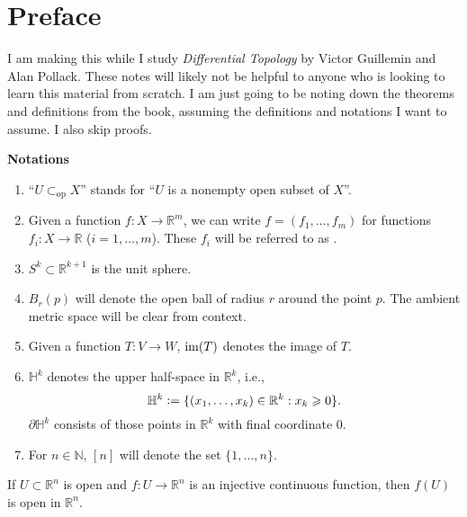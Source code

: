 \documentclass[12pt]{article}
\newcommand{\opsub}{\subset_{\operatorname{op}}}
\begin{document}
\coverpage
\thispagestyle{empty}
\updated{\today}
\thispagestyle{empty}
\tableofcontents
\pagestyle{fancy}
\setcounter{section}{-1}

\section{Preface}

I am making this while I study \emph{Differential Topology} by Victor Guillemin and Alan Pollack. These notes will likely not be helpful to anyone who is looking to learn this material from scratch. I am just going to be noting down the theorems and definitions from the book, assuming the definitions and notations I want to assume. I also skip proofs.

\textbf{Notations}
\begin{enumerate}
	\item ``$U \opsub X$'' stands for ``$U$ is a nonempty open subset of $X$''.
	\item Given a function $f : X \to \mathbb{R}^{m}$, we can write $f = (f_{1}, \ldots, f_{m})$ for functions $f_{i} : X \to \mathbb{R}$ ($i = 1, \ldots, m$). These $f_{i}$ will be referred to as .
	\item $S^{k} \subset \mathbb{R}^{k + 1}$ is the unit sphere.
	\item $B_{r}(p)$ will denote the open ball of radius $r$ around the point $p$. The ambient metric space will be clear from context.
	\item Given a function $T : V \to W$, $\im(T)$ denotes the image of $T$.
	\item $\mathbb{H}^{k}$ denotes the upper half-space in $\mathbb{R}^{k}$, i.e.,
	\begin{equation*} 
		\mathbb{H}^{k} \vcentcolon= \{(x_{1}, \ldots, x_{k}) \in \mathbb{R}^{k} : x_{k} \ge 0\}.
	\end{equation*}
	$\partial \mathbb{H}^{k}$ consists of those points in $\mathbb{R}^{k}$ with final coordinate $0$.
	\item For $n \in \mathbb{N}$, $[n]$ will denote the set $\{1, \ldots, n\}$.
\end{enumerate}

\begin{thm} \label{thm:invariance-of-domain}
	If $U \subset \mathbb{R}^{n}$ is open and $f : U \to \mathbb{R}^{n}$ is an injective continuous function, then $f(U)$ is open in $\mathbb{R}^{n}$.
\end{thm}
\end{document}
